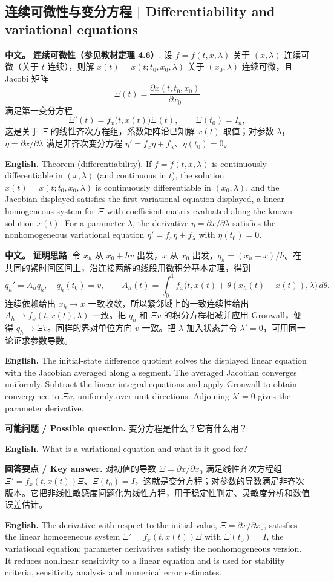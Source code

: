\documentclass[UTF8,11pt,a4paper]{ctexart}
\newcommand{\APS}[2]{\par\noindent\textbf{中文。} #1\par\noindent\textbf{English.} #2\par}
\newcommand{\EN}[1]{\par\noindent \textbf{English.} #1\par}
\newcommand{\ASK}[4]{\par\noindent \textbf{可能问题 / Possible question.} #1\par\EN{#2}\noindent \textbf{回答要点 / Key answer.} #3\par\EN{#4}\medskip}
\begin{document}
\subsection{连续可微性与变分方程 | Differentiability and variational equations}
\APS{\textbf{连续可微性（参见教材定理 4.6）}. 设 $f=f(t,x,\lambda)$ 关于 $(x,\lambda)$ 连续可微（关于 $t$ 连续），则解 $x(t)=x(t;t_0,x_0,\lambda)$ 关于 $(x_0,\lambda)$ 连续可微，且 Jacobi 矩阵
\[
\Xi(t)=\frac{\partial x(t,t_0,x_0)}{\partial x_0}
\]
满足第一变分方程
\[
\Xi'(t)=f_x\bigl(t,x(t)\bigr)\Xi(t),\qquad \Xi(t_0)=I_n ,
\]
这是关于 $\Xi$ 的线性齐次方程组，系数矩阵沿已知解 $x(t)$ 取值；对参数 $\lambda$，$\eta=\partial x/\partial\lambda$ 满足非齐次变分方程 $\eta'=f_x\eta+f_\lambda$、$\eta(t_0)=0$。}{Theorem (differentiability). If $f=f(t,x,\lambda)$ is continuously differentiable in $(x,\lambda)$ (and continuous in $t$), the solution $x(t)=x(t;t_0,x_0,\lambda)$ is continuously differentiable in $(x_0,\lambda)$, and the Jacobian displayed satisfies the first variational equation displayed, a linear homogeneous system for $\Xi$ with coefficient matrix evaluated along the known solution $x(t)$. For a parameter $\lambda$, the derivative $\eta=\partial x/\partial\lambda$ satisfies the nonhomogeneous variational equation $\eta'=f_x\eta+f_\lambda$ with $\eta(t_0)=0$.}
\APS{\textbf{证明思路}. 令 $x_h$ 从 $x_0+hv$ 出发，$x$ 从 $x_0$ 出发，$q_h=(x_h-x)/h$。在共同的紧时间区间上，沿连接两解的线段用微积分基本定理，得到
\[
q_h'=A_hq_h,\quad q_h(t_0)=v,\qquad
A_h(t)=\int_0^1 f_x\bigl(t,x(t)+\theta(x_h(t)-x(t)),\lambda\bigr)\,d\theta.
\]
连续依赖给出 $x_h\to x$ 一致收敛，所以紧邻域上的一致连续性给出 $A_h\to f_x(t,x(t),\lambda)$ 一致。把 $q_h$ 和 $\Xi v$ 的积分方程相减并应用 Gronwall，便得 $q_h\to\Xi v$。同样的界对单位方向 $v$ 一致。把 $\lambda$ 加入状态并令 $\lambda'=0$，可用同一论证求参数导数。}{The initial-state difference quotient solves the displayed linear equation with the Jacobian averaged along a segment. The averaged Jacobian converges uniformly. Subtract the linear integral equations and apply Gronwall to obtain convergence to $\Xi v$, uniformly over unit directions. Adjoining $\lambda'=0$ gives the parameter derivative.}
\ASK{变分方程是什么？它有什么用？}{What is a variational equation and what is it good for?}{对初值的导数 $\Xi=\partial x/\partial x_0$ 满足线性齐次方程组 $\Xi'=f_x(t,x(t))\Xi$、$\Xi(t_0)=I$，这就是变分方程；对参数的导数满足非齐次版本。它把非线性敏感度问题化为线性方程，用于稳定性判定、灵敏度分析和数值误差估计。}{The derivative with respect to the initial value, $\Xi=\partial x/\partial x_0$, satisfies the linear homogeneous system $\Xi'=f_x(t,x(t))\Xi$ with $\Xi(t_0)=I$, the variational equation; parameter derivatives satisfy the nonhomogeneous version. It reduces nonlinear sensitivity to a linear equation and is used for stability criteria, sensitivity analysis and numerical error estimates.}
\end{document}
